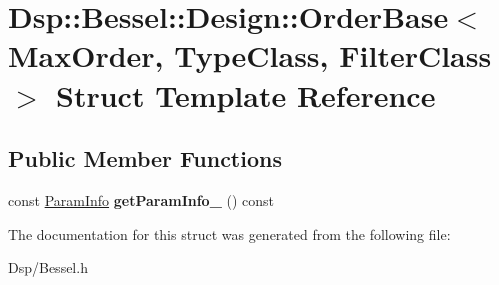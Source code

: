 \hypertarget{structDsp_1_1Bessel_1_1Design_1_1OrderBase}{\section{Dsp\-:\-:Bessel\-:\-:Design\-:\-:Order\-Base$<$ Max\-Order, Type\-Class, Filter\-Class $>$ Struct Template Reference}
\label{structDsp_1_1Bessel_1_1Design_1_1OrderBase}
}
\subsection*{Public Member Functions}
\begin{DoxyCompactItemize}
\item 
\hypertarget{structDsp_1_1Bessel_1_1Design_1_1OrderBase_a6a0ff6e65eaf24daafcbb2461547da55}{const \hyperlink{classDsp_1_1ParamInfo}{Param\-Info} {\bfseries get\-Param\-Info\-\_} () const }\label{structDsp_1_1Bessel_1_1Design_1_1OrderBase_a6a0ff6e65eaf24daafcbb2461547da55}

\end{DoxyCompactItemize}


The documentation for this struct was generated from the following file\-:\begin{DoxyCompactItemize}
\item 
Dsp/Bessel.\-h\end{DoxyCompactItemize}
